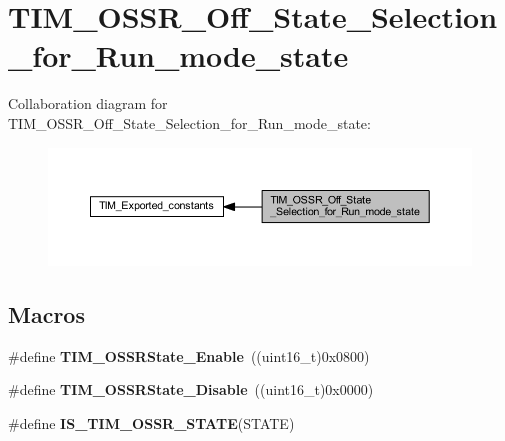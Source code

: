 \hypertarget{group___t_i_m___o_s_s_r___off___state___selection__for___run__mode__state}{}\section{T\+I\+M\+\_\+\+O\+S\+S\+R\+\_\+\+Off\+\_\+\+State\+\_\+\+Selection\+\_\+for\+\_\+\+Run\+\_\+mode\+\_\+state}
\label{group___t_i_m___o_s_s_r___off___state___selection__for___run__mode__state}
Collaboration diagram for T\+I\+M\+\_\+\+O\+S\+S\+R\+\_\+\+Off\+\_\+\+State\+\_\+\+Selection\+\_\+for\+\_\+\+Run\+\_\+mode\+\_\+state\+:\nopagebreak
\begin{figure}[H]
\begin{center}
\leavevmode
\includegraphics[width=350pt]{group___t_i_m___o_s_s_r___off___state___selection__for___run__mode__state}
\end{center}
\end{figure}
\subsection*{Macros}
\begin{DoxyCompactItemize}
\item 
\mbox{\label{group___t_i_m___o_s_s_r___off___state___selection__for___run__mode__state_ga3703ba6189db045bec48c864289f997e}} 
\#define {\bfseries T\+I\+M\+\_\+\+O\+S\+S\+R\+State\+\_\+\+Enable}~((uint16\+\_\+t)0x0800)
\item 
\mbox{\label{group___t_i_m___o_s_s_r___off___state___selection__for___run__mode__state_ga766dfd8b3c32ec1b8b446f0e2dbe7b97}} 
\#define {\bfseries T\+I\+M\+\_\+\+O\+S\+S\+R\+State\+\_\+\+Disable}~((uint16\+\_\+t)0x0000)
\item 
\#define {\bfseries I\+S\+\_\+\+T\+I\+M\+\_\+\+O\+S\+S\+R\+\_\+\+S\+T\+A\+TE}(S\+T\+A\+TE)
\end{DoxyCompactItemize}


